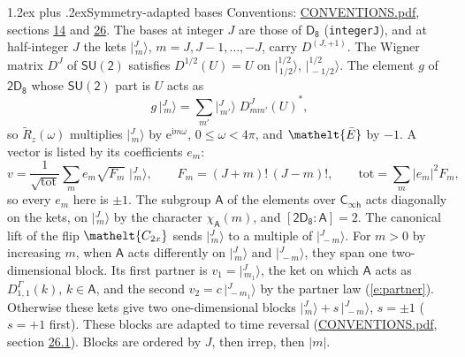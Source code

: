 \documentclass[10pt,a4paper]{article}
\makeatletter
\renewcommand\section{\@startsection{section}{1}{\z@}{-3ex plus -1ex minus -.2ex}%
  {1.2ex plus .2ex}{\normalfont\large\sffamily\bfseries\color{parttitle}}}
\numberwithin{equation}{section}
\newcommand{\eltfont}[1]{{\let\sigma\eltsigma\mathelt{#1}}}
\newcommand{\grp}[1]{\mathsf{#1}}
\newcommand{\elt}[1]{\eltfont{#1}}
\newcommand{\grpindex}[2]{[#1 : #2]}
\newcommand{\iunit}{\mathrm{i}}
\newcommand{\expe}{\mathrm{e}}
\newcommand{\irrJp}[2]{D^{(#1,#2)}}
\newcommand{\repD}[1]{D^{#1}}
\newcommand{\wignerD}[1]{D^{#1}}
\newcommand{\chiA}{\chi_{\grp{A}}}
\newcommand{\conj}[1]{{#1}^{*}}
\newcommand{\jm}[2]{\bigl\lvert{}^{#1}_{\,#2}\bigr\rangle}
\newcommand{\barred}[1]{\bar{#1}}
\newcommand{\lift}[1]{\tilde{#1}}
\makeatother
\begin{document}
\section{Symmetry-adapted bases}\label{s:bases}
Conventions: \href{../../CONVENTIONS.pdf}{CONVENTIONS.pdf}, sections \href{../../../rotation/CONVENTIONS.pdf\#conv.14}{14} and \href{../../CONVENTIONS.pdf\#conv.26}{26}.
\leavevmode\label{n:index.m}\label{n:vector.ket}The bases at integer $J$ are those of \href{../../../rotation/data/pdf/D8.pdf}{$\grp{D_{8}}$} (\texttt{integerJ}), and at half-integer $J$ the kets $\jm{J}{m}$, $m = J, J-1, \dots, -J$, carry $\irrJp{J}{+1}$. \label{n:matrix.wigner}The Wigner matrix $\wignerD{J}$ of $\grp{SU(2)}$ satisfies $\wignerD{1/2}(U) = U$ on $\jm{1/2}{1/2}$, $\jm{1/2}{-1/2}$. The element $g$ of $\grp{2D_{8}}$ whose $\grp{SU(2)}$ part is $U$ acts as
\begin{equation}\label{e:action}g\,\jm{J}{m} = \sum_{m'} \jm{J}{m'}\; \conj{\wignerD{J}_{m m'}(U)},\end{equation}
so $\lift{R}_{z}(\omega)$ multiplies $\jm{J}{m}$ by $\expe^{\iunit m\omega}$, $0 \le \omega < 4\pi$, and $\elt{\barred{E}}$ by $-1$. \label{n:index.ketcoefficient}\label{n:vector.basis.symmetry}\label{n:index.ketweight}\label{n:index.total}A vector is listed by its coefficients $e_m$:
\begin{equation}\label{e:ket}v = \frac{1}{\sqrt{\mathrm{tot}}}\sum_m e_m\sqrt{F_m}\;\jm{J}{m},\qquad F_m = (J+m)!\,(J-m)!,\qquad \mathrm{tot} = \sum_m |e_m|^2F_m,\end{equation}
so every $e_m$ here is $\pm 1$.
\leavevmode\label{n:group.A}\label{n:function.character.abelian}The subgroup $\grp{A}$ of the elements over $\grp{C_{\infty h}}$ acts diagonally on the kets, on $\jm{J}{m}$ by the character $\chiA(m)$, and $\grpindex{\grp{2D_{8}}}{\grp{A}} = 2$. The canonical lift of the flip $\elt{C_{2x}}$ sends $\jm{J}{m}$ to a multiple of $\jm{J}{-m}$. For $m > 0$ by increasing $m$, when $\grp{A}$ acts differently on $\jm{J}{m}$ and $\jm{J}{-m}$, they span one two-dimensional block. \label{n:index.partner.sign}Its first partner is $v_1 = \jm{J}{m_1}$, the ket on which $\grp{A}$ acts as $\repD{\Gamma}_{1,1}(k)$, $k \in \grp{A}$, and the second $v_2 = c\,\jm{J}{-m_1}$ by the partner law (\ref{e:partner}). \label{n:index.pair.sign}Otherwise these kets give two one-dimensional blocks $\jm{J}{m} + s\,\jm{J}{-m}$, $s = \pm 1$ ($s = +1$ first). These blocks are adapted to time reversal (\href{../../CONVENTIONS.pdf}{CONVENTIONS.pdf}, section \href{../../CONVENTIONS.pdf\#conv.26.1}{26.1}). Blocks are ordered by $J$, then irrep, then $|m|$.
\end{document}
